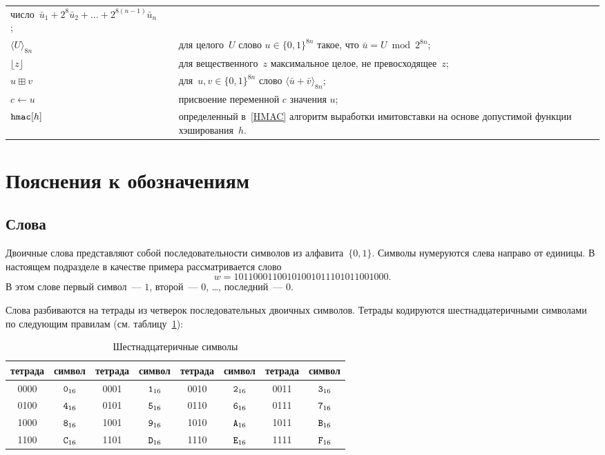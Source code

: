 {\begin{longtable}{lrp{13.5cm}}
число~$\bar u_1+2^8\bar u_2+\ldots+2^{8(n-1)}\bar u_n$;
\\[4pt]
%
$\langle U\rangle_{8n}$ &&
для целого~$U$ 
слово $u\in\{0,1\}^{8n}$ такое, что $\bar u=U\bmod 2^{8n}$;
\\[4pt]
%
$\lfloor z\rfloor$ &&
для вещественного~$z$ максимальное целое, не превосходящее~$z$;
\\[4pt]
%
$u\boxplus v$           &&
для~$u,v\in\{0,1\}^{8n}$ слово $\langle\bar u+\bar v\rangle_{8n}$;
\\[4pt]
%
$c\leftarrow u$         &&
присвоение переменной $c$ значения $u$;
\\[4pt]
%
$\texttt{hmac}[h]$         &&
определенный в~\ref{HMAC}
алгоритм выработки имитовставки на основе 
допустимой функции хэширования~$h$.
\end{longtable}
} %
\setcounter{table}{0}

\section{Пояснения к обозначениям}

\subsection{Слова}

Двоичные слова представляют собой последовательности символов из 
алфавита~$\{0,1\}$. Символы нумеруются слева направо от единицы.
%
В настоящем подразделе в качестве примера рассматривается слово
$$
w=1011 0001 1001 0100 1011 1010 1100 1000.
$$
В этом слове первый символ~--- $1$, 
второй~--- $0$, \ldots, последний~--- $0$.

Слова разбиваются на тетрады из четверок последовательных двоичных символов.
%
Тетрады кодируются шестнадцатеричными символами по следующим правилам
(см. таблицу~\ref{Table.Hex}):

\begin{table}[h]
\caption{Шестнадцатеричные символы}\label{Table.Hex}
\begin{tabular}{|c|c||c|c||c|c||c|c|}
\hline
тетрада & символ & тетрада & символ & тетрада & символ & тетрада & символ\\
\hline
\hline
0000 & $\texttt{0}_{16}$ & 0001 & $\texttt{1}_{16}$ & 
0010 & $\texttt{2}_{16}$ & 0011 & $\texttt{3}_{16}$\\
0100 & $\texttt{4}_{16}$ & 0101 & $\texttt{5}_{16}$ & 
0110 & $\texttt{6}_{16}$ & 0111 & $\texttt{7}_{16}$\\ 
1000 & $\texttt{8}_{16}$ & 1001 & $\texttt{9}_{16}$ & 
1010 & $\texttt{A}_{16}$ & 1011 & $\texttt{B}_{16}$\\ 
1100 & $\texttt{C}_{16}$ & 1101 & $\texttt{D}_{16}$ & 
1110 & $\texttt{E}_{16}$ & 1111 & $\texttt{F}_{16}$\\ 
\hline
\end{tabular}
\end{table}

